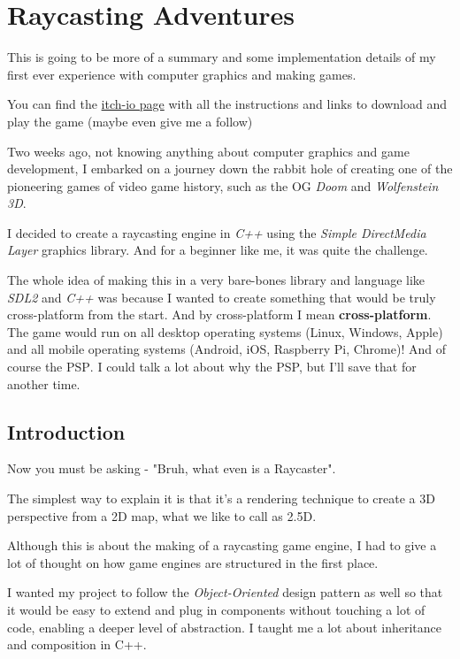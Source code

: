 \justify
\skipspace

\chapter{Raycasting Adventures}

This is going to be more of a summary and some implementation details of my first ever experience with computer graphics and making games.

You can find the \href{https://korigamik.itch.io/untitled-psp}{itch-io page} with all the instructions and links to download and play the game (maybe even give me a follow)

Two weeks ago, not knowing anything about computer graphics and game development, I embarked on a journey down the rabbit hole of creating one of the pioneering games of video game history, such as the OG \textit{Doom} and \textit{Wolfenstein 3D}.

I decided to create a raycasting engine in \textit{C++} using the \textit{Simple DirectMedia Layer} graphics library. And for a beginner like me, it was quite the challenge.

The whole idea of making this in a very bare-bones library and language like \textit{SDL2} and \textit{C++} was because I wanted to create something that would be truly cross-platform from the start. And by cross-platform I mean \textbf{cross-platform}. The game would run on all desktop operating systems (Linux, Windows, Apple) and all mobile operating systems (Android, iOS, Raspberry Pi, Chrome)! And of course the \textsc{PSP}. I could talk a lot about why the PSP, but I'll save that for another time.

\section*{Introduction}

Now you must be asking - "Bruh, what even is a Raycaster".

The simplest way to explain it is that it's a rendering technique to create a 3D perspective from a 2D map, what we like to call as 2.5D.

Although this is about the making of a raycasting game engine, I had to give a lot of thought on how game engines are structured in the first place.

I wanted my project to follow the \textit{Object-Oriented} design pattern as well so that it would be easy to extend and plug in components without touching a lot of code, enabling a deeper level of abstraction. I taught me a lot about inheritance and composition in C++.

